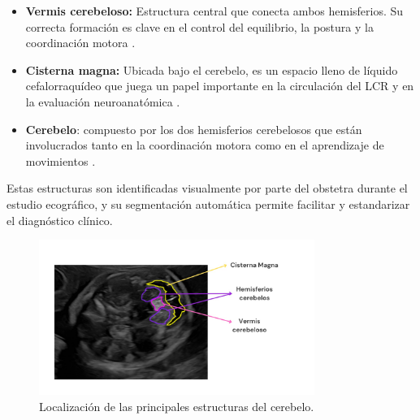 \begin{itemize}
    \item \textbf{Vermis cerebeloso:} Estructura central que conecta ambos hemisferios. Su correcta formación es clave en el control del equilibrio, la postura y la coordinación motora \cite{wolf2009vermis}.
    \item \textbf{Cisterna magna:} Ubicada bajo el cerebelo, es un espacio lleno de líquido cefalorraquídeo que juega un papel importante en la circulación del LCR y en la evaluación neuroanatómica \cite{patel2023cisternamagna}. 
    \item \textbf{Cerebelo}: compuesto por los dos hemisferios cerebelosos que están involucrados tanto en la coordinación motora como en el aprendizaje de movimientos \cite{volpecerebelo}.
\end{itemize}
Estas estructuras son identificadas visualmente por parte del obstetra durante el estudio ecográfico, y su segmentación automática permite facilitar y estandarizar el diagnóstico clínico.

\begin{figure}[h]
    \centering
    \includegraphics[width=0.8\textwidth]{img/estructuras_interes.jpeg}
    \caption{Localización de las principales estructuras del cerebelo.}
    \label{fig: parte_anatomicas_cerebelo}
\end{figure}
